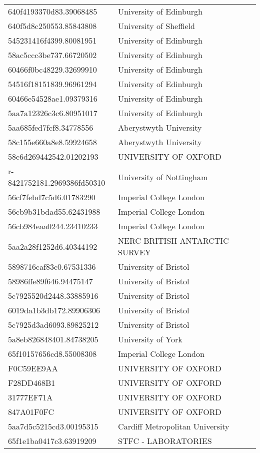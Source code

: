 \begin{tabular}{ll}
640f4193370d83.39068485 & University of Edinburgh \\
640f5d8c250553.85843808 & University of Sheffield \\
545231416f4399.80081951 & University of Edinburgh \\
58ac5ccc3be737.66720502 & University of Edinburgh \\
60466f0bc48229.32699910 & University of Edinburgh \\
54516f18151839.96961294 & University of Edinburgh \\
60466e54528ae1.09379316 & University of Edinburgh \\
5aa7a12326c3c6.80951017 & University of Edinburgh \\
5aa685fed7fcf8.34778556 & Aberystwyth University \\
58c155e660a8e8.59924658 & Aberystwyth University \\
58c6d269442542.01202193 & UNIVERSITY OF OXFORD \\
r-8421752181.2969386fd50310 & University of Nottingham \\
56cf7febd7c5d6.01783290 & Imperial College London \\
56cb9b31bdad55.62431988 & Imperial College London \\
56cb984eaa0244.23410233 & Imperial College London \\
5aa2a28f1252d6.40344192 & NERC BRITISH ANTARCTIC SURVEY \\
5898716caf83c0.67531336 & University of Bristol \\
58986ffe89f646.94475147 & University of Bristol \\
5c7925520d2448.33885916 & University of Bristol \\
6019da1b3db172.89906306 & University of Bristol \\
5c7925d3ad6093.89825212 & University of Bristol \\
5a8eb826848401.84738205 & University of York \\
65f10157656cd8.55008308 & Imperial College London \\
F0C59EE9AA & UNIVERSITY OF OXFORD \\
F28DD468B1 & UNIVERSITY OF OXFORD \\
31777EF71A & UNIVERSITY OF OXFORD \\
847A01F0FC & UNIVERSITY OF OXFORD \\
5aa7d5c5215cd3.00195315 & Cardiff Metropolitan University \\
65f1e1ba0417c3.63919209 & STFC - LABORATORIES \\

\end{tabular}
